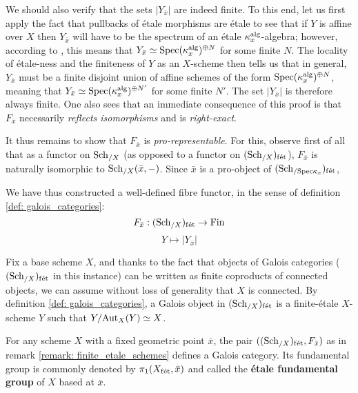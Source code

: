 \begin{remark}
            We should also verify that the sets $|Y_{\bar{x}}|$ are indeed finite. To this end, let us first apply the fact that pullbacks of \'etale morphisms are \'etale to see that if $Y$ is affine over $X$ then $Y_{\bar{x}}$ will have to be the spectrum of an \'etale $\kappa_x^{\mathrm{alg}}$-algebra; however, according to \cite[\href{https://stacks.math.columbia.edu/tag/00U3}{Tag 00U3}]{stacks}, this means that $Y_{\bar{x}} \simeq \mathrm{Spec} (\kappa_x^{\mathrm{alg}})^{\oplus N}$ for some finite $N$. The locality of \'etale-ness and the finiteness of $Y$ as an $X$-scheme then tells us that in general, $Y_{\bar{x}}$ must be a finite disjoint union of affine schemes of the form $\mathrm{Spec} (\kappa_x^{\mathrm{alg}})^{\oplus N}$, meaning that $Y_{\bar{x}} \simeq \mathrm{Spec} (\kappa_x^{\mathrm{alg}})^{\oplus N'}$ for some finite $N'$. The set $|Y_{\bar{x}}|$ is therefore always finite. One also sees that an immediate consequence of this proof is that $F_{\bar{x}}$ necessarily \textit{reflects isomorphisms} and is \textit{right-exact}. 
            
            It thus remains to show that $F_{\bar{x}}$ is \textit{pro-representable}. For this, observe first of all that as a functor on $\mathrm{Sch}_{/X}$ (as opposed to a functor on $(\mathrm{Sch}_{/X})_{\mathrm{f\acute{e}t}}$), $F_{\bar{x}}$ is naturally isomorphic to $\mathrm{Sch}_{/X}(\bar{x}, -)$. Since $\bar{x}$ is a pro-object of $(\mathrm{Sch}_{/\mathrm{Spec} \kappa_x})_{\mathrm{f\acute{e}t}}$, 
            
            We have thus constructed a well-defined fibre functor, in the sense of definition \ref{def: galois_categories}:
                $$F_{\bar{x}}: (\mathrm{Sch}_{/X})_{\mathrm{f\acute{e}t}} \to \mathrm{Fin}$$
                $$Y \mapsto |Y_{\bar{x}}|$$
        \end{remark}
        \begin{remark} \label{remark: galois_schemes}
            Fix a base scheme $X$, and thanks to the fact that objects of Galois categories ($(\mathrm{Sch}_{/X})_{\mathrm{f\acute{e}t}}$ in this instance) can be written as finite coproducts of connected objects, we can assume without loss of generality that $X$ is connected. By definition \ref{def: galois_categories}, a Galois object in $(\mathrm{Sch}_{/X})_{\mathrm{f\acute{e}t}}$ is a finite-\'etale $X$-scheme $Y$ such that $Y/\mathrm{Aut}_X(Y) \simeq X$. 
        \end{remark}
        \begin{definition} \label{def: etale_fundamental_groups}
            For any scheme $X$ with a fixed geometric point $\bar{x}$, the pair $((\mathrm{Sch}_{/X})_{\mathrm{f\acute{e}t}}, F_{\bar{x}})$ as in remark \ref{remark: finite_etale_schemes} defines a Galois category. Its fundamental group is commonly denoted by $\pi_1(X_{\mathrm{f\acute{e}t}}, \bar{x})$ and called the \textbf{\'etale fundamental group} of $X$ based at $\bar{x}$.
        \end{definition}
